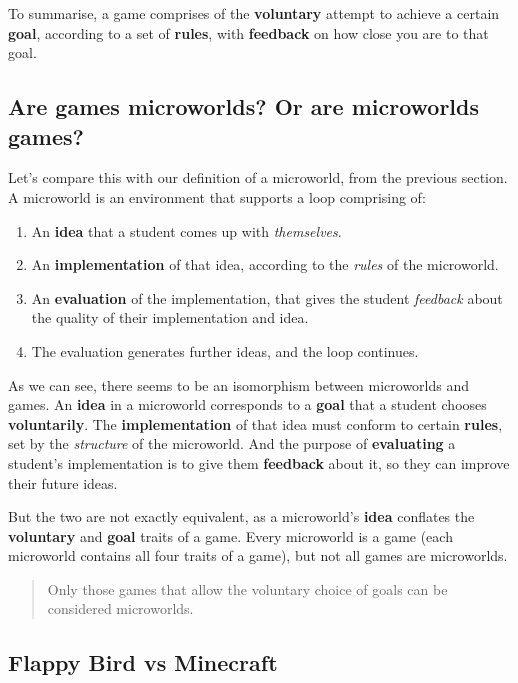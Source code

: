 To summarise, a game comprises of the \textbf{voluntary} attempt to
achieve a certain \textbf{goal}, according to a set of \textbf{rules},
with \textbf{feedback} on how close you are to that goal.

\subsection{Are games microworlds? Or are microworlds games?}

Let's compare this with our definition of a microworld, from the
previous section. A microworld is an environment that supports a loop
comprising of:

\begin{enumerate}[1.]
\item
  An \textbf{idea} that a student comes up with \emph{themselves}.
\item
  An \textbf{implementation} of that idea, according to the \emph{rules}
  of the microworld.
\item
  An \textbf{evaluation} of the implementation, that gives the student
  \emph{feedback} about the quality of their implementation and idea.
\item
  The evaluation generates further ideas, and the loop continues.
\end{enumerate}

As we can see, there seems to be an isomorphism between microworlds and
games. An \textbf{idea} in a microworld corresponds to a \textbf{goal}
that a student chooses \textbf{voluntarily}. The \textbf{implementation}
of that idea must conform to certain \textbf{rules}, set by the
\emph{structure} of the microworld. And the purpose of
\textbf{evaluating} a student's implementation is to give them
\textbf{feedback} about it, so they can improve their future ideas.

But the two are not exactly equivalent, as a microworld's \textbf{idea}
conflates the \textbf{voluntary} and \textbf{goal} traits of a game.
Every microworld is a game (each microworld contains all four traits of
a game), but not all games are microworlds.

\begin{quote}
Only those games that allow the voluntary choice of goals can be
considered microworlds.
\end{quote}

\subsection{Flappy Bird vs Minecraft}

